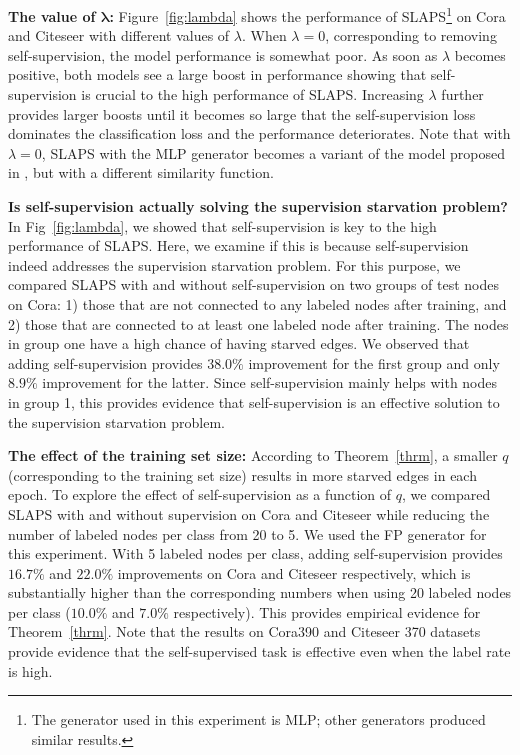 \documentclass{article}
\begin{document}
\textbf{The value of $\bm{\lambda}$:} Figure~\ref{fig:lambda} shows the performance of SLAPS\footnote{The generator used in this experiment is MLP; other generators produced similar results.} on Cora and Citeseer with different values of $\lambda$. When $\lambda=0$, corresponding to removing self-supervision, the model performance is somewhat poor. As soon as $\lambda$ becomes positive, both models see a large boost in performance showing that self-supervision is crucial to the high performance of SLAPS. Increasing $\lambda$ further provides larger boosts until it becomes so large that the self-supervision loss dominates the classification loss and the performance deteriorates. Note that with $\lambda=0$, SLAPS with the MLP generator becomes a variant of the model proposed in \cite{cosmo2020latent}, but with a different similarity function.

\textbf{Is self-supervision actually solving the supervision starvation problem?} In Fig~\ref{fig:lambda}, we showed that self-supervision is key to the high performance of SLAPS. Here, we examine if this is because self-supervision indeed addresses the supervision starvation problem. For this purpose, we compared SLAPS with and without self-supervision on two groups of test nodes on Cora: 1) those that are not connected to any labeled nodes after training, and 2) those that are connected to at least one labeled node after training. The nodes in group one have a high chance of having starved edges. We observed that adding self-supervision provides $38.0\%$ improvement for the first group and only $8.9\%$ improvement for the latter. Since self-supervision mainly helps with nodes in group 1, this provides evidence that self-supervision is an effective solution to the supervision starvation problem.

\textbf{The effect of the training set size:} According to Theorem~\ref{thrm}, a smaller $q$ (corresponding to the training set size) results in more starved edges in each epoch. To explore the effect of self-supervision as a function of $q$, we compared SLAPS with and without supervision on Cora and Citeseer while reducing the number of labeled nodes per class from 20 to 5. We used the FP generator for this experiment. With 5 labeled nodes per class, adding self-supervision provides  $16.7\%$ and $22.0\%$ improvements on Cora and Citeseer respectively, which is substantially higher than the corresponding numbers when using 20 labeled nodes per class ($10.0\%$ and $7.0\%$ respectively). 
This provides empirical evidence for Theorem~\ref{thrm}. Note that the results on Cora390 and Citeseer 370 datasets provide evidence that the self-supervised task is effective even when the label rate is high.
\end{document}
